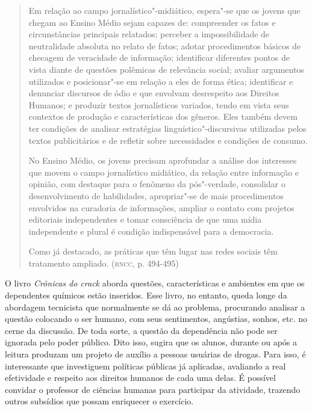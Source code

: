 \documentclass[11pt]{extarticle}
\begin{document}
\begin{quote}
Em relação ao campo jornalístico"-midiático, espera"-se que os jovens
que chegam ao Ensino Médio sejam capazes de: compreender os fatos e
circunstâncias principais relatados; perceber a impossibilidade de
neutralidade absoluta no relato de fatos; adotar procedimentos básicos
de checagem de veracidade de informação; identificar diferentes pontos
de vista diante de questões polêmicas de relevância social; avaliar
argumentos utilizados e posicionar"-se em relação a eles de forma ética;
identificar e denunciar discursos de ódio e que envolvam desrespeito aos
Direitos Humanos; e produzir textos jornalísticos variados, tendo em
vista seus contextos de produção e características dos gêneros. Eles
também devem ter condições de analisar estratégias
linguístico"-discursivas utilizadas pelos textos publicitários e de
refletir sobre necessidades e condições de consumo.

No Ensino Médio, os jovens precisam aprofundar a análise dos interesses
que movem o campo jornalístico midiático, da relação entre informação e
opinião, com destaque para o fenômeno da pós"-verdade, consolidar o
desenvolvimento de habilidades, apropriar"-se de mais procedimentos
envolvidos na curadoria de informações, ampliar o contato com projetos
editoriais independentes e tomar consciência de que uma mídia
independente e plural é condição indispensável para a democracia.

Como já destacado, as práticas que têm lugar nas redes sociais têm
tratamento ampliado. (\textsc{bncc}, p. 494-495)
\end{quote}

O livro \emph{Crônicas do crack} aborda questões, características e
ambientes em que os dependentes químicos estão inseridos. Esse livro,
no entanto, queda longe da abordagem tecnicista que normalmente se dá
ao problema, procurando analisar a questão colocando o ser humano, com
seus sentimentos, angústias, sonhos, etc. no cerne da discussão. De
toda sorte, a questão da dependência não pode ser ignorada pelo poder
público. Dito isso, sugira que os alunos, durante ou após a leitura
produzam um projeto de auxílio a pessoas usuárias de drogas. Para
isso, é interessante que investiguem políticas públicas já aplicadas,
avaliando a real efetividade e respeito aos direitos humanos de cada
uma delas. É possível convidar o professor de ciências humanas para
participar da atividade, trazendo outros subsídios que possam
enriquecer o exercício.

\end{document}
